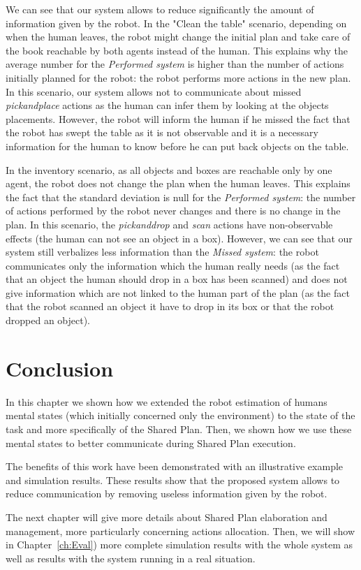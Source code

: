 \documentclass[english,a4paper,11pt,twoside]{StyleThese}
\begin{document}
We can see that our system allows to reduce significantly the amount of information given by the robot. In the "Clean the table" scenario, depending on when the human leaves, the robot might change the initial plan and take care of the book reachable by both agents instead of the human. This explains why the average number for the \textit{Performed system} is higher than the number of actions initially planned for the robot: the robot performs more actions in the new plan. In this scenario, our system allows not to communicate about missed \textit{pickandplace} actions as the human can infer them by looking at the objects placements. However, the robot will inform the human if he missed the fact that the robot has swept the table as it is not observable and it is a necessary information for the human to know before he can put back objects on the table.

In the inventory scenario, as all objects and boxes are reachable only by one agent, the robot does not change the plan when the human leaves. This explains the fact that the standard deviation is null for the \textit{Performed system}: the number of actions performed by the robot never changes and there is no change in the plan. In this scenario, the \textit{pickanddrop} and \textit{scan} actions have non-observable effects (the human can not see an object in a box). However, we can see that our system still verbalizes less information than the \textit{Missed system}: the robot communicates only the information which the human really needs (as the fact that an object the human should drop in a box has been scanned) and does not give information which are not linked to the human part of the plan (as the fact that the robot scanned an object it have to drop in its box or that the robot dropped an object).


\section{Conclusion}

In this chapter we shown how we extended the robot estimation of humans mental states (which initially concerned only the environment) to the state of the task and more specifically of the Shared Plan. Then, we shown how we use these mental states to better communicate during Shared Plan execution.

The benefits of this work have been demonstrated with an illustrative example and simulation results. These results show that the proposed system allows to reduce communication by removing useless information given by the robot.

The next chapter will give more details about Shared Plan elaboration and management, more particularly concerning actions allocation. Then, we will show in Chapter~\ref{ch:Eval}) more complete simulation results with the whole system as well as results with the system running in a real situation.

\ifdefined{}
\else


\end{document}
